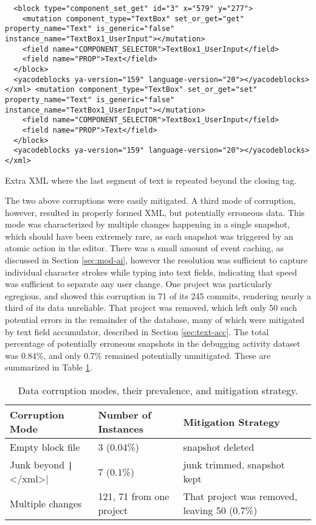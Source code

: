 \begin{listing}
\begin{verbatim}
  <block type="component_set_get" id="3" x="579" y="277">
    <mutation component_type="TextBox" set_or_get="get" property_name="Text" is_generic="false" instance_name="TextBox1_UserInput"></mutation>
    <field name="COMPONENT_SELECTOR">TextBox1_UserInput</field>
    <field name="PROP">Text</field>
  </block>
  <yacodeblocks ya-version="159" language-version="20"></yacodeblocks>
</xml> <mutation component_type="TextBox" set_or_get="set" property_name="Text" is_generic="false" instance_name="TextBox1_UserInput"></mutation>
    <field name="COMPONENT_SELECTOR">TextBox1_UserInput</field>
    <field name="PROP">Text</field>
  </block>
  <yacodeblocks ya-version="159" language-version="20"></yacodeblocks>
</xml>
\end{verbatim}
\caption[Extra XML beyond the closing tag]{Extra XML where the last segment of text is repeated beyond the closing tag.}
\label{list:badxmltrailing}
\end{listing}

The two above corruptions were easily mitigated. A third mode of corruption, however, resulted in properly formed XML, but potentially erroneous data. This mode was characterized by multiple changes happening in a single snapshot, which should have been extremely rare, as each snapshot was triggered by an atomic action in the editor. There was a small amount of event caching, as discussed in Section \ref{sec:mod-ai}, however the resolution was sufficient to capture individual character strokes while typing into text fields, indicating that speed was sufficient to separate any user change. One project was particularly egregious, and showed this corruption in 71 of its 245 commits, rendering nearly a third of its data unreliable. That project was removed, which left only 50 such potential errors in the remainder of the database, many of which were mitigated by text field accumulator, described in Section \ref{sec:text-acc}. The total percentage of potentially erroneous snapshots in the debugging activity dataset was 0.84\%, and only 0.7\% remained potentially unmitigated. These are summarized in Table \ref{tab:data-corruption}.


\begin{table}
\begin{centering}
	\begin{tabular}{l l p{5.4cm}}
	Corruption Mode & Number of Instances & Mitigation Strategy \\ \hline
	Empty block file & 3 (0.04\%) & snapshot deleted \\
	Junk beyond \texttt|</xml>| & 7 (0.1\%) & junk trimmed, snapshot kept \\
	Multiple changes & 121, 71 from one project & That project was removed, leaving 50 (0.7\%) 
	\end{tabular}
	\caption[Data corruption modes]{Data corruption modes, their prevalence, and mitigation strategy.}
	\label{tab:data-corruption}
\end{centering}
\end{table}

